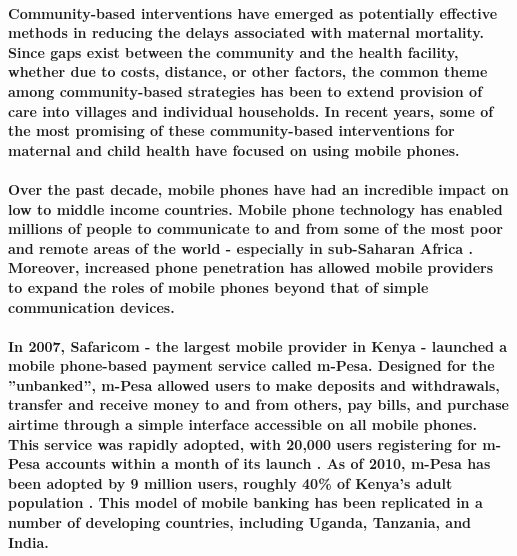 \paragraph{Community-based interventions have emerged as potentially effective methods in reducing the delays associated with maternal mortality. Since gaps exist between the community and the health facility, whether due to costs, distance, or other factors, the common theme among community-based strategies has been to extend provision of care into villages and individual households. In recent years, some of the most promising of these community-based interventions for maternal and child health have focused on using mobile phones.}

\paragraph{Over the past decade, mobile phones have had an incredible impact on low to middle income countries. Mobile phone technology has enabled millions of people to communicate to and from some of the most poor and remote areas of the world - especially in sub-Saharan Africa \citep{Adler2007}. Moreover, increased phone penetration has allowed mobile providers to expand the roles of mobile phones  beyond that of simple communication devices.}

\paragraph{In 2007, Safaricom - the largest mobile provider in Kenya - launched a mobile phone-based payment service called m-Pesa. Designed for the ''unbanked'', m-Pesa allowed users to make deposits and withdrawals, transfer and receive money to and from others, pay bills, and purchase airtime through a simple interface accessible on all mobile phones. This service was rapidly adopted, with 20,000 users registering for m-Pesa accounts within a month of its launch \citep{Hughes2007}. As of 2010, m-Pesa has been adopted by 9 million users, roughly 40\% of Kenya's adult population \citep{Mas2010}. This model of mobile banking has been replicated in a number of developing countries, including Uganda, Tanzania, and India.}

